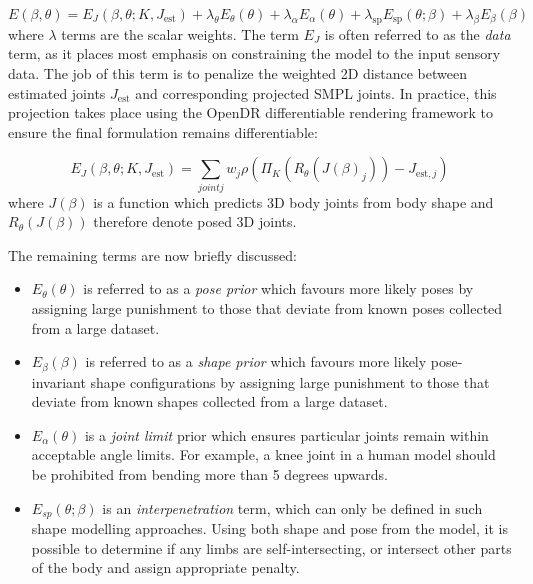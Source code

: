 \begin{equation}
E(\beta, \theta) = E_{J}(\beta, \theta; K, J_{\text{est}}) + \lambda_{\theta}E_{\theta}(\theta) + \lambda_{\alpha}E_{\alpha}(\theta) + \lambda_{\text{sp}}E_{\text{sp}}(\theta; \beta) + \lambda_{\beta}E_{\beta}(\beta)
\end{equation}
where $\lambda$ terms are the scalar weights. The term $E_{J}$ is often referred to as the \textit{data} term, as it places most emphasis on constraining the model to the input sensory data. The job of this term is to penalize the weighted 2D distance between estimated joints $J_{\text{est}}$ and corresponding projected SMPL joints. In practice, this projection takes place using the OpenDR differentiable rendering framework to ensure the final formulation remains differentiable:

\begin{equation}
    E_{J}(\beta, \theta; K, J_{\text{est}}) = \sum_{joint j} w_{j} \rho(\Pi_{K}(R_{\theta}(J(\beta)_j)) - J_{\text{est}, j})
\end{equation}
where $J(\beta)$ is a function which predicts 3D body joints from body shape and $R_{\theta}(J(\beta))$ therefore denote posed 3D joints.

The remaining terms are now briefly discussed:
\clearpage
\begin{itemize}
    \item $E_{\theta}(\theta)$ is referred to as a \textit{pose prior} which favours more likely poses by assigning large punishment to those that deviate from known poses collected from a large dataset.
    \item $E_{\beta}(\beta)$ is referred to as a \textit{shape prior} which favours more likely pose-invariant shape configurations by assigning large punishment to those that deviate from known shapes collected from a large dataset. 
    \item $E_{\alpha}(\theta)$ is a \textit{joint limit} prior which ensures particular joints remain within acceptable angle limits. For example, a knee joint in a human model should be prohibited from bending more than 5 degrees upwards.
    \item $E_{sp}(\theta; \beta)$ is an \textit{interpenetration} term, which can only be defined in such shape modelling approaches. Using both shape and pose from the model, it is possible to determine if any limbs are self-intersecting, or intersect other parts of the body and assign appropriate penalty.
\end{itemize}

